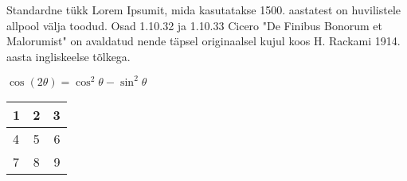 \documentclass{21kuur}
\begin{document}
Standardne tükk Lorem Ipsumit, mida kasutatakse 1500. aastatest on huvilistele allpool välja toodud. Osad 1.10.32 ja 1.10.33 Cicero "De Finibus Bonorum et Malorumist" on avaldatud nende täpsel originaalsel kujul koos H. Rackami 1914. aasta ingliskeelse tõlkega.

$\cos (2\theta) = \cos^2 \theta - \sin^2 \theta$

\begin{center}
  \begin{tabular}{| l | c | r |}
    \hline
    1 & 2 & 3 \\ \hline
    4 & 5 & 6 \\ \hline
    7 & 8 & 9 \\
    \hline
  \end{tabular}
\end{center}
\end{document}
